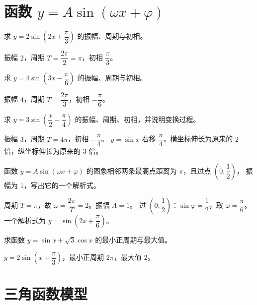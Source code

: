 \section{函数 $y=A\sin(\omega x+\varphi)$}

\begin{problem}
求 $y=2\sin\left(2x+\dfrac{\pi}{3}\right)$ 的振幅、周期与初相。
\end{problem}
\begin{solution}
振幅 $2$，周期 $T=\dfrac{2\pi}{2}=\pi$，初相 $\dfrac{\pi}{3}$。
\end{solution}

\begin{problem}
求 $y=4\sin\left(3x-\dfrac{\pi}{6}\right)$ 的振幅、周期与初相。
\end{problem}
\begin{solution}
振幅 $4$，周期 $T=\dfrac{2\pi}{3}$，初相 $-\dfrac{\pi}{6}$。
\end{solution}

\begin{problem}
求 $y=3\sin\left(\dfrac{x}{2}-\dfrac{\pi}{4}\right)$ 的振幅、周期、初相，并说明变换过程。
\end{problem}
\begin{solution}
振幅 $3$，周期 $T=4\pi$，初相 $-\dfrac{\pi}{4}$。
$y=\sin x$ 右移 $\dfrac{\pi}{4}$，横坐标伸长为原来的 $2$ 倍，纵坐标伸长为原来的 $3$ 倍。
\end{solution}

\begin{problem}
函数 $y=A\sin(\omega x+\varphi)$ 的图象相邻两条最高点距离为 $\pi$，且过点 $\left(0,\dfrac12\right)$，
振幅为 $1$，写出它的一个解析式。
\end{problem}
\begin{solution}
周期 $T=\pi$，故 $\omega=\dfrac{2\pi}{T}=2$。振幅 $A=1$。
过 $\left(0,\dfrac12\right)$：$\sin\varphi=\dfrac12$，取 $\varphi=\dfrac{\pi}{6}$。
一个解析式为 $y=\sin\left(2x+\dfrac{\pi}{6}\right)$。
\end{solution}

\begin{problem}
求函数 $y=\sin x+\sqrt3\cos x$ 的最小正周期与最大值。
\end{problem}
\begin{solution}
$y=2\sin\left(x+\dfrac{\pi}{3}\right)$，最小正周期 $2\pi$，最大值 $2$。
\end{solution}

\section{三角函数模型}

